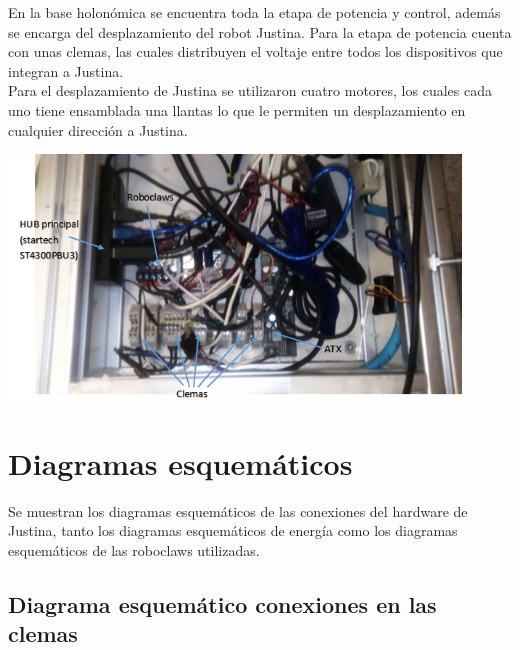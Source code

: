 \documentclass[user_manual.tex]{subfiles}
\begin{document}
En la base holonómica se encuentra toda la etapa de potencia y control, además se encarga del desplazamiento del robot Justina. Para la etapa de potencia cuenta con unas clemas, las cuales distribuyen el voltaje entre todos los dispositivos que integran a Justina.\\

Para el desplazamiento de Justina se utilizaron cuatro motores, los cuales cada uno tiene ensamblada una llantas lo que le permiten un desplazamiento en cualquier dirección a Justina.

\begin{center}
\includegraphics[width=0.9\textwidth]{Figures/Hardware/Diagramas/Base.png}
\label{fig:Hardware:Diagramas:Justina:Base}
\end{center}

\section{Diagramas esquemáticos}
Se muestran los diagramas esquemáticos de las conexiones del hardware de Justina, tanto los diagramas esquemáticos de energía como los diagramas esquemáticos de las roboclaws utilizadas.


\subsection{Diagrama esquemático conexiones en las clemas}
\end{document}
